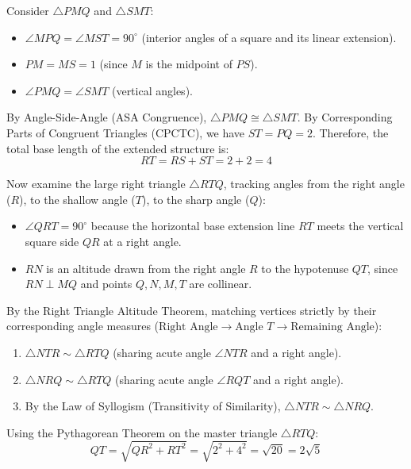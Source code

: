 \begin{enumerate}
 Consider $\triangle PMQ$ and $\triangle SMT$:

 
            \begin{itemize}
        \item $\angle MPQ = \angle MST = 90^\circ$ (interior angles of a square and its linear extension).
        \item $PM = MS = 1$ (since $M$ is the midpoint of $PS$).
        \item $\angle PMQ = \angle SMT$ (vertical angles).
            \end{itemize}
            By Angle-Side-Angle (ASA Congruence), $\triangle PMQ \cong \triangle SMT$. By Corresponding Parts of Congruent Triangles (CPCTC), we have $ST = PQ = 2$. Therefore, the total base length of the extended structure is:
 \[RT = RS + ST = 2 + 2 = 4\]

 Now examine the large right triangle $\triangle RTQ$, tracking angles from the right angle ($R$), to the shallow angle ($T$), to the sharp angle ($Q$):

 
            \begin{itemize}
        \item $\angle QRT = 90^\circ$ because the horizontal base extension line $RT$ meets the vertical square side $QR$ at a right angle.
        \item $RN$ is an altitude drawn from the right angle $R$ to the hypotenuse $QT$, since $RN \perp MQ$ and points $Q, N, M, T$ are collinear.
            \end{itemize}
            By the Right Triangle Altitude Theorem, matching vertices strictly by their corresponding angle measures ($\text{Right Angle} \rightarrow \text{Angle } T \rightarrow \text{Remaining Angle}$):

 
            \begin{enumerate}
        \item $\triangle NTR \sim \triangle RTQ$ (sharing acute angle $\angle NTR$ and a right angle).
        \item $\triangle NRQ \sim \triangle RTQ$ (sharing acute angle $\angle RQT$ and a right angle).
        \item By the Law of Syllogism (Transitivity of Similarity), $\triangle NTR \sim \triangle NRQ$.
            \end{enumerate}
            
Using the Pythagorean Theorem on the master triangle $\triangle RTQ$:
 \[QT = \sqrt{QR^2 + RT^2} = \sqrt{2^2 + 4^2} = \sqrt{20} = 2\sqrt{5}\]


\end{enumerate}
